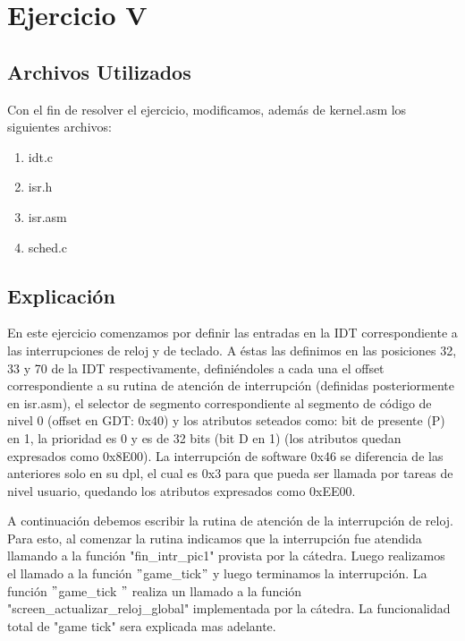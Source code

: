 \documentclass[a4paper]{article}
\begin{document}
\newpage

\section{Ejercicio V}
\subsection{Archivos Utilizados}

Con el fin de resolver el ejercicio, modificamos, además de kernel.asm los siguientes archivos:

\begin{enumerate}

\item idt.c
\item isr.h
\item isr.asm
\item sched.c

\end{enumerate}


\subsection{Explicación}

En este ejercicio comenzamos por definir las entradas en la IDT correspondiente a las interrupciones de reloj y de teclado. A éstas las definimos en las posiciones 32, 33 y 70 de la IDT respectivamente, definiéndoles a cada una el offset correspondiente a su rutina de atención de interrupción (definidas posteriormente en isr.asm), el selector de segmento correspondiente al segmento de código de nivel 0 (offset en GDT: 0x40) y los atributos seteados como: bit de presente (P) en 1, la prioridad es 0 y es de 32 bits (bit D en 1) (los atributos quedan expresados como 0x8E00). La interrupción de software 0x46 se diferencia de las anteriores solo en su dpl, el cual es 0x3 para que pueda ser llamada por tareas de nivel usuario, quedando los atributos expresados como 0xEE00.

A continuación debemos escribir la rutina de atención de la interrupción de reloj. Para esto, al comenzar la rutina indicamos que la interrupción fue atendida llamando a la función "fin_intr_pic1" provista por la cátedra. Luego realizamos el llamado a la función $"$game_tick$"$ y luego terminamos la interrupción. La función $"$game_tick $"$ realiza un llamado a la función "screen_actualizar_reloj_global" implementada por la cátedra. La funcionalidad total de "game tick" sera explicada mas adelante.
\end{document}
